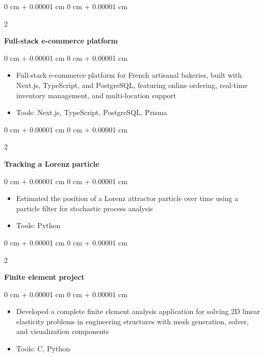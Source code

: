 \documentclass[10pt, letterpaper]{article}
\newenvironment{highlights}{
    \begin{itemize}[
        topsep=0.10 cm,
        parsep=0.10 cm,
        partopsep=0pt,
        itemsep=0pt,
        leftmargin=0 cm + 10pt
    ]
}{
    \end{itemize}
} %
\newenvironment{onecolentry}{
    \begin{adjustwidth}{
        0 cm + 0.00001 cm
    }{
        0 cm + 0.00001 cm
    }
}{
    \end{adjustwidth}
} %
\newenvironment{twocolentry}[2][]{
    \onecolentry
    \def\secondColumn{#2}
    \setcolumnwidth{\fill, 4.5 cm}
    \begin{paracol}{2}
}{
    \switchcolumn \raggedleft \secondColumn
    \end{paracol}
    \endonecolentry
} %
\begin{document}
        \begin{twocolentry}{
            
        }
            \textbf{Full-stack e-commerce platform}\end{twocolentry}
        \vspace{0.10 cm}
        \begin{onecolentry}
            \begin{highlights}
                \item Full-stack e-commerce platform for French artisanal bakeries, built with Next.js, TypeScript, and PostgreSQL, featuring online ordering, real-time inventory management, and multi-location support
                \item Tools: Next.js, TypeScript, PostgreSQL, Prisma
            \end{highlights}
        \end{onecolentry}
        \vspace{0.2 cm}
        
        \begin{twocolentry}{
            
        }
            \textbf{Tracking a Lorenz particle}\end{twocolentry}
        \vspace{0.10 cm}
        \begin{onecolentry}
            \begin{highlights}
                \item Estimated the position of a Lorenz attractor particle over time using a particle filter for stochastic process analysis
                \item Tools: Python
            \end{highlights}
        \end{onecolentry}
        \vspace{0.2 cm}
         
        
        \begin{twocolentry}{
            
        }
            \textbf{Finite element project}\end{twocolentry}
        \vspace{0.10 cm}
        \begin{onecolentry}
            \begin{highlights}
                \item Developed a complete finite element analysis application for solving 2D linear elasticity problems in engineering structures with mesh generation, solver, and visualization components
                \item Tools: C, Python
            \end{highlights}
        \end{onecolentry}
        \vspace{0.2 cm}
    
\end{document}
